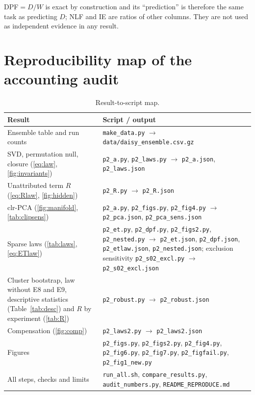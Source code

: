 DPF$=D/W$ is exact by construction and its ``prediction'' is therefore the same task as predicting $D$; NLF and IE are ratios of other columns. They are not used as independent evidence in any result.

\section{Reproducibility map of the accounting audit}\label{app:reproB}
\begin{table}[H]\centering\footnotesize
\caption{Result-to-script map.}
\begin{tabularx}{\textwidth}{XX}
\toprule
Result & Script / output\\\midrule
Ensemble table and run counts & \texttt{make\_data.py} $\to$ \texttt{data/daisy\_ensemble.csv.gz}\\
SVD, permutation null, closure (\cref{eq:law}, \cref{fig:invariants}) & \texttt{p2\_a.py}, \texttt{p2\_laws.py} $\to$ \texttt{p2\_a.json}, \texttt{p2\_laws.json}\\
Unattributed term $R$ (\cref{eq:Rlaw}, \cref{fig:hidden}) & \texttt{p2\_R.py} $\to$ \texttt{p2\_R.json}\\
clr-PCA (\cref{fig:manifold}, \cref{tab:clipsens}) & \texttt{p2\_a.py}, \texttt{p2\_figs.py}, \texttt{p2\_fig4.py} $\to$ \texttt{p2\_pca.json}, \texttt{p2\_pca\_sens.json}\\
Sparse laws (\cref{tab:laws}, \cref{eq:ETlaw}) & \texttt{p2\_et.py}, \texttt{p2\_dpf.py}, \texttt{p2\_figs2.py}, \texttt{p2\_nested.py} $\to$ \texttt{p2\_et.json}, \texttt{p2\_dpf.json}, \texttt{p2\_etlaw.json}, \texttt{p2\_nested.json}; exclusion sensitivity \texttt{p2\_s02\_excl.py} $\to$ \texttt{p2\_s02\_excl.json}\\
Cluster bootstrap, law without E8 and E9, descriptive statistics (Table~\ref{tab:desc}) and $R$ by experiment (\cref{tab:R}) & \texttt{p2\_robust.py} $\to$ \texttt{p2\_robust.json}\\
Compensation (\cref{fig:comp}) & \texttt{p2\_laws2.py} $\to$ \texttt{p2\_laws2.json}\\
Figures & \texttt{p2\_figs.py}, \texttt{p2\_figs2.py}, \texttt{p2\_fig4.py}, \texttt{p2\_fig6.py}, \texttt{p2\_fig7.py}, \texttt{p2\_figfail.py}, \texttt{p2\_fig1\_new.py}\\
All steps, checks and limits & \texttt{run\_all.sh}, \texttt{compare\_results.py}, \texttt{audit\_numbers.py}, \texttt{README\_REPRODUCE.md}\\\bottomrule
\end{tabularx}
\end{table}


